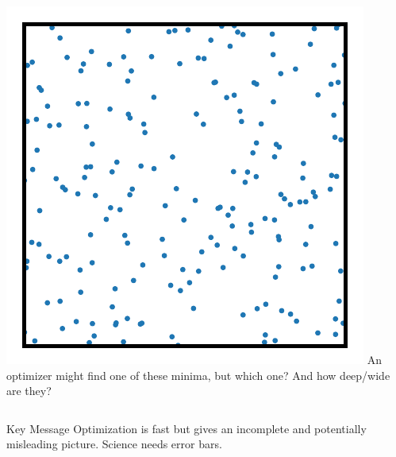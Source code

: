 \documentclass[aspectratio=169]{beamer}
\begin{document}
\begin{frame}
\begin{columns}[T]
        \begin{center}
            \includegraphics[width=\textwidth,page=1]{figures/himmelblau_ns.pdf} %
            An optimizer might find one of these minima, but which one? And how deep/wide are they?
        \end{center}
    \end{columns}
    
    \vspace{1em}
    \begin{alertblock}{Key Message}
        Optimization is fast but gives an incomplete and potentially misleading picture. Science needs error bars.
    \end{alertblock}
\end{frame}
\end{document}
